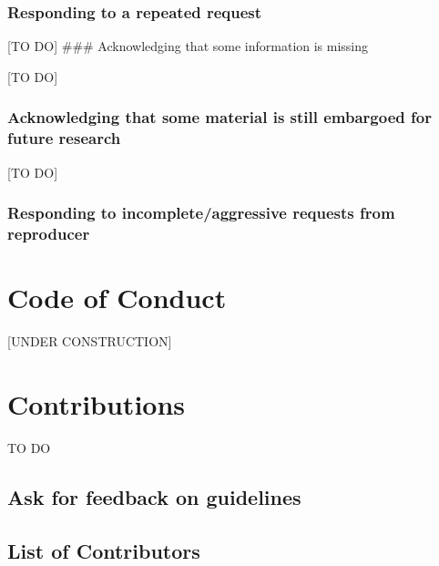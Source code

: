 \documentclass[]{book}
\begin{document}
\hypertarget{responding-to-a-repeated-request}{%
\subsection{Responding to a repeated request}\label{responding-to-a-repeated-request}}

{[}TO DO{]}
\#\#\# Acknowledging that some information is missing

{[}TO DO{]}

\hypertarget{acknowledging-that-some-material-is-still-embargoed-for-future-research}{%
\subsection{Acknowledging that some material is still embargoed for future research}\label{acknowledging-that-some-material-is-still-embargoed-for-future-research}}

{[}TO DO{]}

\hypertarget{responding-to-incompleteaggressive-requests-from-reproducer}{%
\subsection{Responding to incomplete/aggressive requests from reproducer}\label{responding-to-incompleteaggressive-requests-from-reproducer}}

\hypertarget{code-of-conduct}{%
\chapter{Code of Conduct}\label{code-of-conduct}}

{[}UNDER CONSTRUCTION{]}

\hypertarget{contributions}{%
\chapter{Contributions}\label{contributions}}

TO DO

\hypertarget{ask-for-feedback-on-guidelines}{%
\section{Ask for feedback on guidelines}\label{ask-for-feedback-on-guidelines}}

\hypertarget{list-of-contributors}{%
\section{List of Contributors}\label{list-of-contributors}}
\end{document}
